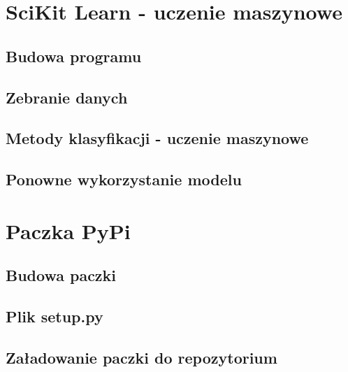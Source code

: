 \section{SciKit Learn - uczenie maszynowe}
\subsection{Budowa programu}
\subsection{Zebranie danych}
\subsection{Metody klasyfikacji - uczenie maszynowe}
\subsection{Ponowne wykorzystanie modelu}

\section{Paczka PyPi}
\subsection{Budowa paczki}
\subsection{Plik setup.py}
\subsection{Załadowanie paczki do repozytorium}
